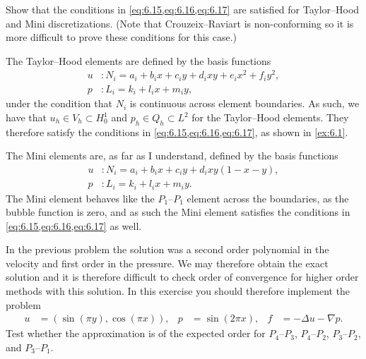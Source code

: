 \begin{exercise}{6.2}
    Show that the conditions in \cref{eq:6.15,eq:6.16,eq:6.17} are satisfied for Taylor--Hood and Mini discretizations. %
    (Note that Crouzeix--Raviart is non-conforming so it is more difficult to prove these conditions for this case.) %
\end{exercise}

\begin{solution}{6.2}
    The Taylor--Hood elements are defined by the basis functions %
    \begin{equation}
        \begin{split}
            u &: N_i = a_i + b_i x + c_i y + d_i x y + e_i x^2 + f_i y^2, \\
            p &: L_i = k_i + l_i x + m_i y,
        \end{split}
    \end{equation}
    under the condition that $N_i$ is continuous across element boundaries.
    As such, we have that $u_h \in V_h \subset H^1_0$ and $p_h \in Q_h \subset L^2$ for the Taylor--Hood elements. %
    They therefore satisfy the conditions in \cref{eq:6.15,eq:6.16,eq:6.17}, as shown in \cref{ex:6.1}.

    The Mini elements are, as far as I understand, defined by the basis functions
    \begin{equation}
        \begin{split}
            u &: N_i = a_i + b_i x + c_i y + d_i xy(1 - x - y), \\
            p &: L_i = k_i + l_i x + m_i y.
        \end{split}
    \end{equation}
    The Mini element behaves like the $P_1$--$P_1$ element across the boundaries, as the bubble function is zero, and as such the Mini element satisfies the conditions in \cref{eq:6.15,eq:6.16,eq:6.17} as well.
\end{solution}

\begin{exercise}{6.6}
    In the previous problem the solution was a second order polynomial in the velocity and first order in the pressure.
    We may therefore obtain the exact solution and it is therefore difficult to check order of convergence for higher order methods with this solution.
    In this exercise you should therefore implement the problem
    \begin{align*}
        u &= (\sin(\pi y), \cos(\pi x)),
        & p &= \sin(2 \pi x),
        & f &= -\Delta u - \nabla p.
    \end{align*}
    Test whether the approximation is of the expected order for $P_4$--$P_3$, $P_4$--$P_2$, $P_3$--$P_2$, and $P_3$--$P_1$.
\end{exercise}

